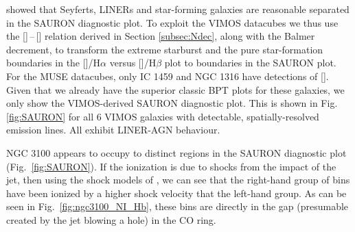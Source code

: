 		\citet{Sarzi2010} showed that Seyferts, LINERs and star-forming galaxies are reasonable separated in the SAURON diagnostic plot. To exploit the VIMOS datacubes we thus use the []\,--\,[] relation derived in Section \ref{subsec:Ndec}, along with the Balmer decrement, to transform the \citet{Kewley2001} extreme starburst and the \citet{Kauffmann2003a} pure star-formation boundaries in the []/H$\alpha$ versus []/H$\beta$ plot to boundaries in the SAURON plot. For the MUSE datacubes, only IC 1459 and NGC 1316 have detections of []. Given that we already have the superior classic BPT plots for these galaxies, we only show the VIMOS-derived SAURON diagnostic plot. This is shown in Fig.\,\ref{fig:SAURON} for all 6 VIMOS galaxies with detectable, spatially-resolved emission lines. All exhibit LINER-AGN behaviour. 

		NGC 3100 appears to occupy to distinct regions in the SAURON diagnostic plot (Fig.\ \ref{fig:SAURON}). If the ionization is due to shocks from the impact of the jet, then using the shock models of \citet{Allen2008}, we can see that the right-hand group of bins have been ionized by a higher shock velocity that the left-hand group. As can be seen in Fig.\ \ref{fig:ngc3100_NI_Hb}, these bins are directly in the gap (presumable created by the jet blowing a hole) in the CO ring.

